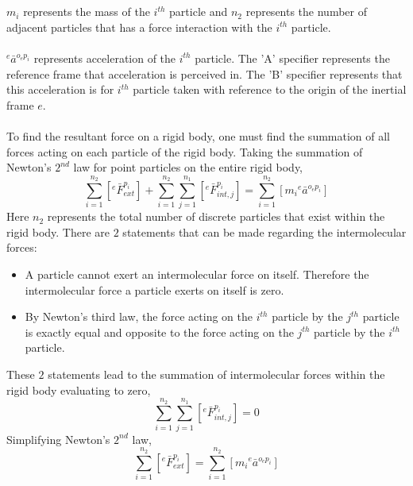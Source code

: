 \documentclass[a4paper, 12pt]{report}
\begin{document}
\begin{center}
\\~\\$m_{i}$ represents the mass of the $i^{th}$ particle and $n_{2}$ represents the number of adjacent particles that has a force interaction with the $i^{th}$ particle.
\\~\\${}^{e}\bar{a}^{o_{e}p_{i}}$ represents acceleration of the $i^{th}$ particle. The 'A' specifier represents the reference frame that acceleration is perceived in. The 'B' specifier represents that this acceleration is for $i^{th}$ particle taken with reference to the origin of the inertial frame $e$.
\\~\\To find the resultant force on a rigid body, one must find the summation of all forces acting on each particle of the rigid body. Taking the summation of Newton's $2^{nd}$ law for point particles on the entire rigid body,
$$\sum^{n_{2}}_{i = 1}\left[{}^{e}\bar{F}^{p_{i}}_{ext}\right] + \sum^{n_{2}}_{i = 1}\sum^{n_{1}}_{j = 1}\left[{}^{e}\bar{F}^{p_{i}}_{int,j}\right] = \sum^{n_{2}}_{i = 1}\left[m_{i}{}^{e}\bar{a}^{o_{e}p_{i}}\right]$$
Here $n_{2}$ represents the total number of discrete particles that exist within the rigid body. There are $2$ statements that can be made regarding the intermolecular forces:
\begin{itemize}
    \item A particle cannot exert an intermolecular force on itself. Therefore the intermolecular force a particle exerts on itself is zero.
    \item By Newton's third law, the force acting on the $i^{th}$ particle by the $j^{th}$ particle is exactly equal and opposite to the force acting on the $j^{th}$ particle by the $i^{th}$ particle.
\end{itemize}
These $2$ statements lead to the summation of intermolecular forces within the rigid body evaluating to zero,
$$\sum^{n_{2}}_{i = 1}\sum^{n_{1}}_{j = 1}\left[{}^{e}\bar{F}^{p_{i}}_{int,j}\right] = 0$$
Simplifying Newton's $2^{nd}$ law,
\begin{equation}\sum^{n_{2}}_{i = 1}\left[{}^{e}\bar{F}^{p_{i}}_{ext}\right] = \sum^{n_{2}}_{i = 1}\left[m_{i}{}^{e}\bar{a}^{o_{e}p_{i}}\right]\label{mambah-1}\end{equation}


\end{center}
\end{document}
